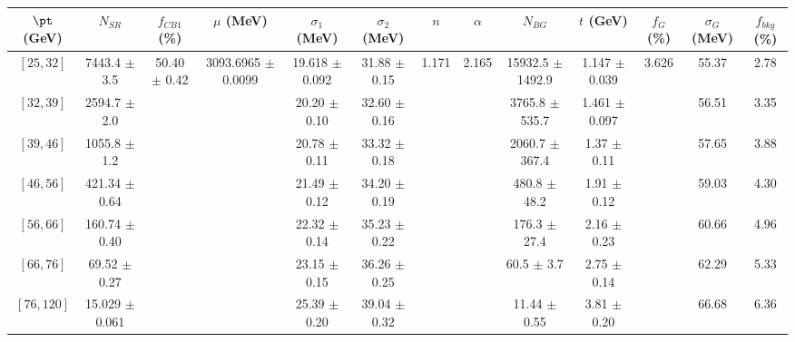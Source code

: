 \begin{tabular}{c||c|c|c|c|c|c|c|c|c|c|c||c}
$\pt$ (GeV) & $N_{SR}$ & $f_{CB1}$ (\%) & $\mu$ (MeV) & $\sigma_1$ (MeV) & $\sigma_2$ (MeV) & $n$ & $\alpha$ & $N_{BG}$ & $t$ (GeV) & $f_G$ (\%) & $\sigma_G$ (MeV) & $f_{bkg}$ (\%) \\
\hline
$[25, 32]$ & 7443.4 $\pm$ 3.5 & \multirow{7}{*}{50.40 $\pm$ 0.42} & \multirow{7}{*}{3093.6965 $\pm$ 0.0099} & 19.618 $\pm$ 0.092 & 31.88 $\pm$ 0.15 & \multirow{7}{*}{1.171} & \multirow{7}{*}{2.165} & 15932.5 $\pm$ 1492.9 & 1.147 $\pm$ 0.039 & \multirow{7}{*}{3.626} & 55.37 & 2.78\\
$[32, 39]$ & 2594.7 $\pm$ 2.0 &  &  & 20.20 $\pm$ 0.10 & 32.60 $\pm$ 0.16 &  &  & 3765.8 $\pm$ 535.7 & 1.461 $\pm$ 0.097 &  & 56.51 & 3.35\\
$[39, 46]$ & 1055.8 $\pm$ 1.2 &  &  & 20.78 $\pm$ 0.11 & 33.32 $\pm$ 0.18 &  &  & 2060.7 $\pm$ 367.4 & 1.37 $\pm$ 0.11 &  & 57.65 & 3.88\\
$[46, 56]$ & 421.34 $\pm$ 0.64 &  &  & 21.49 $\pm$ 0.12 & 34.20 $\pm$ 0.19 &  &  & 480.8 $\pm$ 48.2 & 1.91 $\pm$ 0.12 &  & 59.03 & 4.30\\
$[56, 66]$ & 160.74 $\pm$ 0.40 &  &  & 22.32 $\pm$ 0.14 & 35.23 $\pm$ 0.22 &  &  & 176.3 $\pm$ 27.4 & 2.16 $\pm$ 0.23 &  & 60.66 & 4.96\\
$[66, 76]$ & 69.52 $\pm$ 0.27 &  &  & 23.15 $\pm$ 0.15 & 36.26 $\pm$ 0.25 &  &  & 60.5 $\pm$ 3.7 & 2.75 $\pm$ 0.14 &  & 62.29 & 5.33\\
$[76, 120]$ & 15.029 $\pm$ 0.061 &  &  & 25.39 $\pm$ 0.20 & 39.04 $\pm$ 0.32 &  &  & 11.44 $\pm$ 0.55 & 3.81 $\pm$ 0.20 &  & 66.68 & 6.36\\
\end{tabular}
